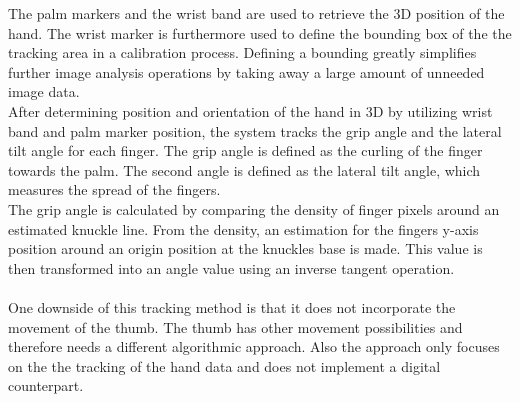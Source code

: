 The palm markers and the wrist band are used to retrieve the 3D position of the hand. The wrist marker is furthermore used to define the bounding box of the the tracking area in a calibration process. Defining a bounding greatly simplifies further image analysis operations by taking away a large amount of unneeded image data.\\
After determining position and orientation of the hand in 3D by utilizing wrist band and palm marker position, the system tracks the grip angle and the lateral tilt angle for each finger.
The grip angle is defined as the curling of the finger towards the palm. The second angle is defined as the lateral tilt angle, which measures the spread of the fingers.\\The grip angle is calculated by comparing the density of finger pixels around an estimated knuckle line. From the density, an estimation for the fingers y-axis position around an origin position at the knuckles base is made. This value is then transformed into an angle value using an inverse tangent operation.\\\\
One downside of this tracking method is that it does not incorporate the movement of the thumb. The thumb has other movement possibilities and therefore needs a different algorithmic approach. Also the approach only focuses on the the tracking of the hand data and does not implement a digital counterpart.
